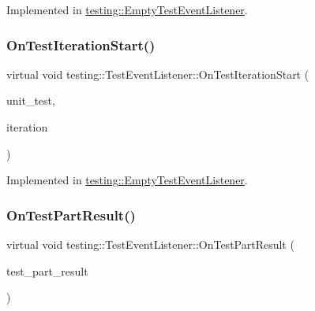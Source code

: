 Implemented in \hyperlink{classtesting_1_1EmptyTestEventListener_aae9c5c61e476f0c421402fb1dde434d2}{testing\+::\+Empty\+Test\+Event\+Listener}.

\mbox{\label{classtesting_1_1TestEventListener_a60cc09b7907cb329d152eb5e7133bdeb}} 
\subsubsection{\texorpdfstring{On\+Test\+Iteration\+Start()}{OnTestIterationStart()}}
{\footnotesize\ttfamily virtual void testing\+::\+Test\+Event\+Listener\+::\+On\+Test\+Iteration\+Start (\begin{DoxyParamCaption}\item[{const \hyperlink{classtesting_1_1UnitTest}{Unit\+Test} \&}]{unit\+\_\+test,  }\item[{int}]{iteration }\end{DoxyParamCaption})\hspace{0.3cm}{\ttfamily [pure virtual]}}



Implemented in \hyperlink{classtesting_1_1EmptyTestEventListener_a31edf103561e8b4d747656bc2d927661}{testing\+::\+Empty\+Test\+Event\+Listener}.

\mbox{\label{classtesting_1_1TestEventListener_a054f8705c883fa120b91473aff38f2ee}} 
\subsubsection{\texorpdfstring{On\+Test\+Part\+Result()}{OnTestPartResult()}}
{\footnotesize\ttfamily virtual void testing\+::\+Test\+Event\+Listener\+::\+On\+Test\+Part\+Result (\begin{DoxyParamCaption}\item[{const Test\+Part\+Result \&}]{test\+\_\+part\+\_\+result }\end{DoxyParamCaption})\hspace{0.3cm}{\ttfamily [pure virtual]}}



